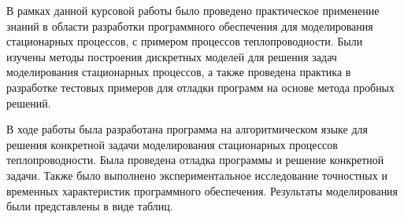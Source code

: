 В рамках данной курсовой работы было проведено практическое применение знаний в области
разработки программного обеспечения для моделирования стационарных процессов, с примером
процессов теплопроводности. Были изучены методы построения дискретных моделей для решения
задач моделирования стационарных процессов, а также проведена практика в разработке тестовых
примеров для отладки программ на основе метода пробных решений.

В ходе работы была разработана программа на алгоритмическом языке для решения конкретной
задачи моделирования стационарных процессов теплопроводности. Была проведена отладка программы
и решение конкретной задачи. Также было выполнено экспериментальное исследование точностных и
временных характеристик программного обеспечения. Результаты моделирования были представлены в
виде таблиц.